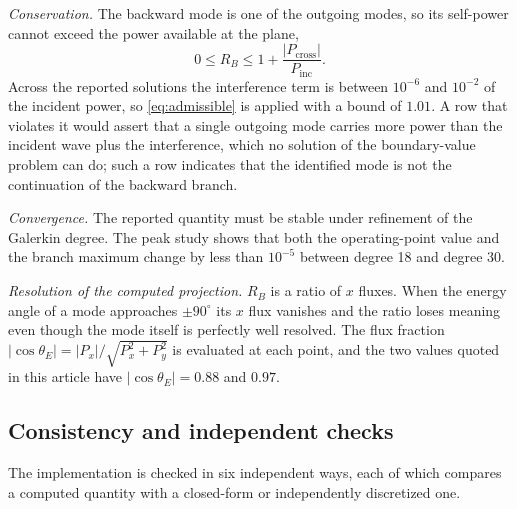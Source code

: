 \emph{Conservation.}  The backward mode is one of the outgoing modes, so its
self-power cannot exceed the power available at the plane,
\begin{equation}
\label{eq:admissible}
0\le R_B\le1+\frac{|P_{\text{cross}}|}{P_{\text{inc}}} .
\end{equation}
Across the reported solutions the interference term is between $10^{-6}$ and
$10^{-2}$ of the incident power, so \eqref{eq:admissible} is applied with a
bound of $1.01$.  A row that violates it would assert that a single outgoing
mode carries more power than the incident wave plus the interference, which no
solution of the boundary-value problem can do; such a row indicates that the
identified mode is not the continuation of the backward branch.

\emph{Convergence.}  The reported quantity must be stable under refinement of
the Galerkin degree.  The peak study shows that both the
operating-point value and the branch maximum change by less than $10^{-5}$
between degree 18 and degree 30.

\emph{Resolution of the computed projection.}  $R_B$ is a ratio of $x$ fluxes.
When the energy angle of a mode approaches $\pm90^{\circ}$ its $x$ flux
vanishes and the ratio loses meaning even though the mode itself is perfectly
well resolved.  The flux fraction
$|\cos\theta_E|=|P_x|/\sqrt{P_x^2+P_y^2}$ is evaluated at each point, and the two values quoted in this article have $|\cos\theta_E|=0.88$ and $0.97$.

\subsection{Consistency and independent checks}
\label{sec:numerics_verification}

The implementation is checked in six independent ways, each of which compares
a computed quantity with a closed-form or independently discretized one.

